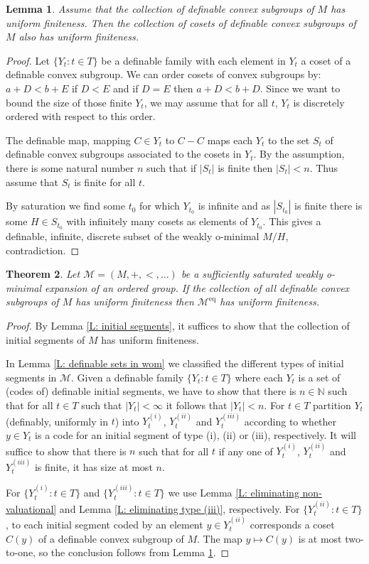\documentclass[11pt]{amsart}
\DeclareMathOperator{\eq}{eq}
\newtheorem{theorem}{Theorem}[section]
\newtheorem{lemma}[theorem]{Lemma}
\theoremstyle{definition}
\newcommand{\Nn}{{\mathbb{N}}}
\newcommand{\CM}{{\mathcal M}}
\newcommand{\0}{\emptyset}
\begin{document}
\begin{lemma}\label{L:UF grp implies UF cosets}
    Assume that the collection of definable convex subgroups of $M$ has uniform finiteness. Then the collection of cosets of definable convex subgroups of $M$ also has uniform finiteness.
\end{lemma}
\begin{proof}
    Let $\{Y_t: t\in T\}$ be a definable family with each  element in $Y_t$ a coset of a definable convex subgroup. We can order cosets of convex subgroups by: $a+D<b+E$ if $D<E$ and if $D=E$ then $a+D<b+D$. Since we want to bound the size of those finite $Y_t$, we may assume that for all $t$, $Y_t$ is discretely ordered with respect to this order.
    
    The definable map, mapping $C\in Y_t$ to $C-C$ maps each $Y_t$ to the set $S_t$ of definable convex subgroups associated to the cosets in $Y_t$. By the assumption, there is some natural number $n$ such that if $|S_t|$ is  finite then $|S_t|<n$. Thus assume that $S_t$ is finite for all $t$.

    By saturation we find some $t_0$ for which $Y_{t_0}$ is infinite and as $|S_{t_0}|$ is finite there is some $H\in S_{t_0}$ with infinitely many cosets as elements of $Y_{t_0}$. This gives a definable, infinite, discrete subset of the weakly o-minimal $M/H$, contradiction.
\end{proof}

\begin{theorem}\label{T: convex subgroups is enough}
    Let $\CM=(M,+,<,\dots)$ be a sufficiently saturated weakly o-minimal expansion of an ordered group. If the collection of all definable convex subgroups of $M$ has uniform finiteness then $\CM^{\eq}$ has uniform finiteness.
\end{theorem}
\begin{proof}
    By Lemma \ref{L: initial segments}, it suffices to show that the collection of initial segments of $M$ has uniform finiteness. 
    
	In Lemma \ref{L: definable sets in wom} we classified the different types of initial segments in $\CM$.  Given a definable family $\{Y_t: t\in T\}$  where each $Y_t$ is a set of (codes of) definable initial segments, we have to show that there is $n\in \Nn$ such that for all $t\in T$ such that $|Y_t|<\infty$ it follows that $|Y_t|< n$. For $t\in T$ partition $Y_t$ (definably, uniformly in $t$) into $Y_t^{(i)}$, $Y_t^{(ii)}$ and $Y_t^{(iii)}$ according to whether $y\in Y_t$ is a code for an initial segment of type (i), (ii) or (iii), respectively. It will suffice to show that there is $n$ such that for all $t$ if any one of $Y_t^{(i)}$, $Y_t^{(ii)}$ and $Y_t^{(iii)}$ is finite, it has size at most $n$. 
    
    For $\{Y_t^{(i)}: t\in T\}$ and $\{Y_t^{(iii)}: t\in T\}$  we use  Lemma \ref{L: eliminating non-valuational} and  Lemma \ref{L: eliminating type (iii)}, respectively. For $\{Y_t^{(ii)}: t\in T\}$,  to each initial segment coded by an element $y\in Y_t^{(ii)}$  corresponds a coset $C(y)$ of a definable convex subgroup of $M$. The map $y\mapsto C(y)$ is at most two-to-one, so the conclusion follows from Lemma \ref{L:UF grp implies UF cosets}. 
    \end{proof}
\end{document}
